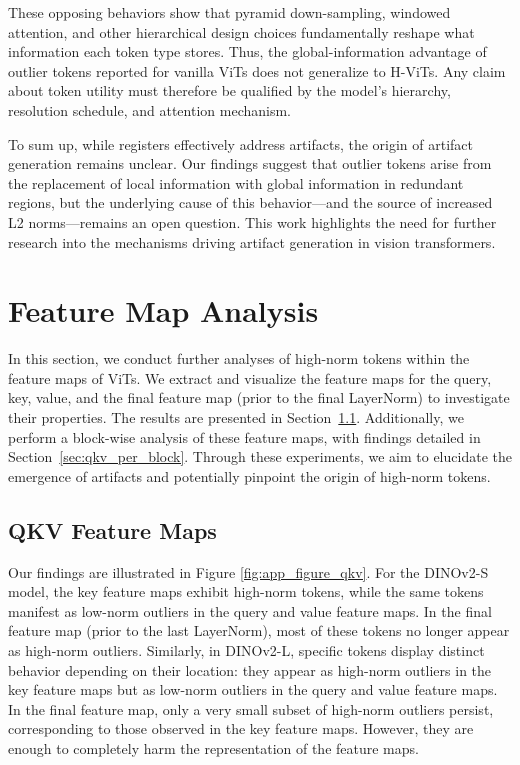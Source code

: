 \documentclass[10pt]{article} %
\begin{document}
These opposing behaviors show that pyramid down-sampling, windowed attention, and other hierarchical design choices fundamentally reshape what information each token type stores. Thus, the global-information advantage of outlier tokens reported for vanilla ViTs does not generalize to H-ViTs. Any claim about token utility must therefore be qualified by the model’s hierarchy, resolution schedule, and attention mechanism.


To sum up, while registers effectively address artifacts, the origin of artifact generation remains unclear. Our findings suggest that outlier tokens arise from the replacement of local information with global information in redundant regions, but the underlying cause of this behavior—and the source of increased L2 norms—remains an open question. This work highlights the need for further research into the mechanisms driving artifact generation in vision transformers.

\newpage




\newpage

\appendix
\section{Feature Map Analysis}
In this section, we conduct further analyses of high-norm tokens within the feature maps of ViTs. We extract and visualize the feature maps for the query, key, value, and the final feature map (prior to the final LayerNorm) to investigate their properties. The results are presented in Section~\ref{sec:qkv}. Additionally, we perform a block-wise analysis of these feature maps, with findings detailed in Section~\ref{sec:qkv_per_block}. Through these experiments, we aim to elucidate the emergence of artifacts and potentially pinpoint the origin of high-norm tokens.

\subsection{QKV Feature Maps}
\label{sec:qkv}
Our findings are illustrated in Figure \ref{fig:app_figure_qkv}. For the DINOv2-S model, the key feature maps exhibit high-norm tokens, while the same tokens manifest as low-norm outliers in the query and value feature maps. In the final feature map (prior to the last LayerNorm), most of these tokens no longer appear as high-norm outliers. Similarly, in DINOv2-L, specific tokens display distinct behavior depending on their location: they appear as high-norm outliers in the key feature maps but as low-norm outliers in the query and value feature maps. In the final feature map, only a very small subset of high-norm outliers persist, corresponding to those observed in the key feature maps. However, they are enough to completely harm the representation of the feature maps.
\end{document}
